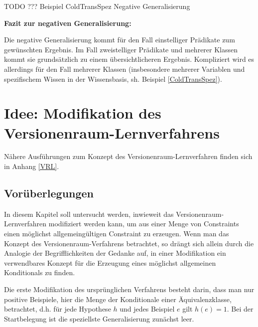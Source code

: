 \documentclass[a4paper, 11pt]{book}
\begin{document}
TODO ??? Beispiel ColdTransSpez Negative Generalisierung

\textbf{{\large Fazit zur negativen Generalisierung:}} \label{Fazit neg Gen} 

\noindent
Die negative Generalisierung kommt für den Fall einstelliger Prädikate zum gewünschten Ergebnis. Im Fall zweistelliger Prädikate und mehrerer Klassen kommt sie grundsätzlich zu einem übersichtlicheren Ergebnis. Kompliziert wird es allerdings für den Fall mehrerer Klassen (insbesondere mehrerer Variablen und spezifischem Wissen in der Wissensbasis, sh. Beispiel \ref{ColdTransSpez}).


	\section{Idee: Modifikation des Versionenraum-Lernverfahrens} \label{Verwendbar VRL} 
	Nähere Ausführungen zum Konzept des Versionenraum-Lernverfahren finden sich in Anhang \ref{VRL}.\\
	\subsection{Vorüberlegungen}
	In diesem Kapitel soll untersucht werden, inwieweit das Versionenraum-Lernverfahren modifiziert werden kann, um aus einer Menge von Constraints einen möglichst allgemeingültigen Constraint zu erzeugen. Wenn man das Konzept des Versionenraum-Verfahrens betrachtet, so drängt sich allein durch die Analogie der Begrifflichkeiten der Gedanke auf, in einer Modifikation ein verwendbares Konzept für die Erzeugung eines möglichst allgemeinen Konditionals zu finden.
	
	Die erste Modifikation des ursprünglichen Verfahrens besteht darin, dass man nur positive Beispiele, hier die Menge der Konditionale einer Äquivalenzklasse, betrachtet, d.h. für jede Hypothese $ h $ und jedes Beispiel $ e $ gilt $ h(e) = 1 $.
	Bei der Startbelegung ist die speziellste Generalisierung zunächst leer. 
\end{document}
